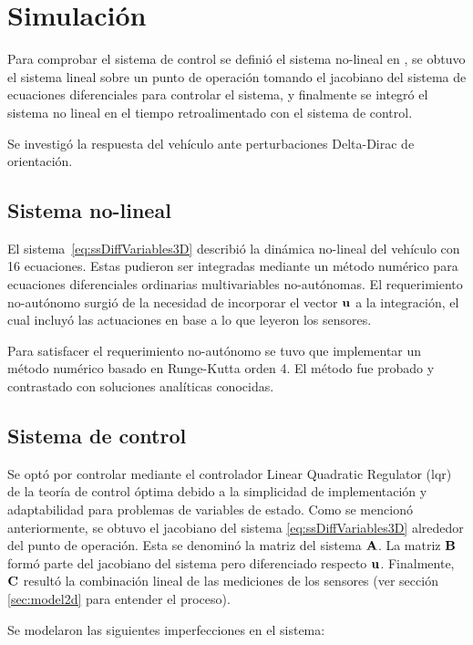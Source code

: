 \section{Simulación}\label{sec:simulation}

Para comprobar el sistema de control se definió el sistema no-lineal en \Matlab, se obtuvo el sistema lineal sobre un punto de operación tomando el jacobiano del sistema de ecuaciones diferenciales para controlar el sistema, y finalmente se integró el sistema no lineal en el tiempo retroalimentado con el sistema de control.

Se investigó la respuesta del vehículo ante perturbaciones Delta-Dirac de orientación.

\subsection{Sistema no-lineal}

El sistema~\eqref{eq:ssDiffVariables3D} describió la dinámica no-lineal del vehículo con 16 ecuaciones. Estas pudieron ser integradas mediante un método numérico para ecuaciones diferenciales ordinarias multivariables no-autónomas. El requerimiento no-autónomo surgió de la necesidad de incorporar el vector $\mathbf{u}$ a la integración, el cual incluyó las actuaciones en base a lo que leyeron los sensores. 

\medskip

Para satisfacer el requerimiento no-autónomo se tuvo que implementar un método numérico basado en Runge-Kutta orden 4. El método fue probado y contrastado con soluciones analíticas conocidas.

\subsection{Sistema de control}

Se optó por controlar mediante el controlador Linear Quadratic Regulator (\gls{lqr}) de la teoría de control óptima debido a la simplicidad de implementación y adaptabilidad para problemas de variables de estado. Como se mencionó anteriormente, se obtuvo el jacobiano del sistema \eqref{eq:ssDiffVariables3D} alrededor del punto de operación. Esta se denominó la matriz del sistema $\mathbf{A}$. La matriz $\mathbf{B}$ formó parte del jacobiano del sistema pero diferenciado respecto $\mathbf{u}$. Finalmente, $\mathbf{C}$ resultó la combinación lineal de las mediciones de los sensores (ver sección \ref{sec:model2d} para entender el proceso). 

Se modelaron las siguientes imperfecciones en el sistema:

